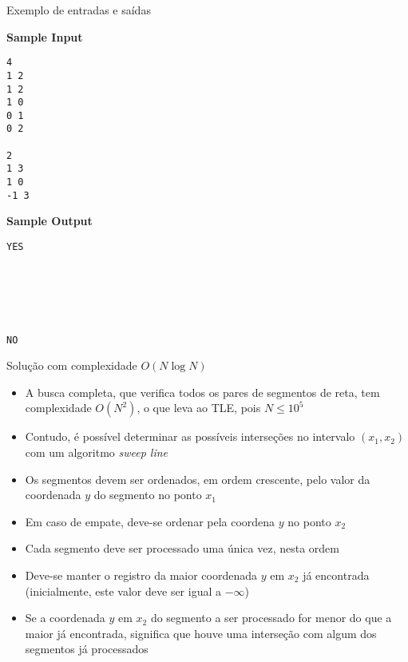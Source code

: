 \begin{frame}[fragile]{Exemplo de entradas e saídas}

\begin{minipage}[t]{0.5\textwidth}
\textbf{Sample Input}
\begin{verbatim}
4
1 2
1 2
1 0
0 1
0 2

2
1 3
1 0
-1 3
\end{verbatim}
\end{minipage}
\begin{minipage}[t]{0.45\textwidth}
\textbf{Sample Output}
\begin{verbatim}
YES






NO
\end{verbatim}
\end{minipage}
\end{frame}

\begin{frame}[fragile]{Solução com complexidade $O(N\log N)$}

    \begin{itemize}
        \item A busca completa, que verifica todos os pares de segmentos de reta, tem
            complexidade $O(N^2)$, o que leva ao TLE, pois $N\leq 10^5$

        \item Contudo, é possível determinar as possíveis interseções no intervalo
            $(x_1, x_2)$ com um algoritmo \textit{sweep line} 

        \item Os segmentos devem ser ordenados, em ordem crescente, pelo valor da coordenada
            $y$ do segmento no ponto $x_1$

        \item Em caso de empate, deve-se ordenar pela coordena $y$ no ponto $x_2$

        \item Cada segmento deve ser processado uma única vez, nesta ordem

        \item Deve-se manter o registro da maior coordenada $y$ em $x_2$ já encontrada 
            (inicialmente, este valor deve ser igual a $-\infty$)

        \item Se a coordenada $y$ em $x_2$ do segmento a ser processado for menor do que
            a maior já encontrada, significa que houve uma interseção com algum dos segmentos
            já processados 
    \end{itemize}

\end{frame}


